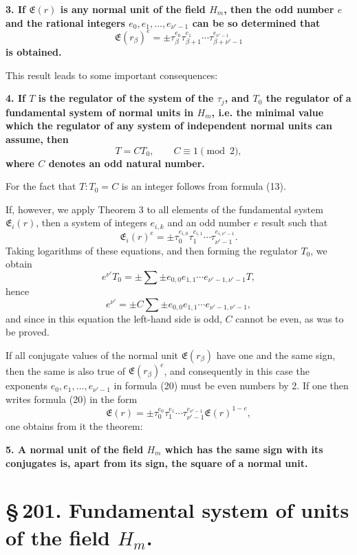 \documentclass[11pt]{article}
\begin{document}
\begin{center}\textbf{3. If $\mathfrak E(r)$ is any normal unit of the field $H_m$, then the odd number $e$ and the rational integers $e_0,e_1,\ldots,e_{\nu'-1}$ can be so determined that}
\[
\mathfrak E(r_\beta)^e=\pm\tau_\beta^{e_0}\tau_{\beta+1}^{e_1}\cdots\tau_{\beta+\nu'-1}^{e_{\nu'-1}}
\tag{20}
\]
\textbf{is obtained.}\end{center}

This result leads to some important consequences:

\begin{center}\textbf{4. If $T$ is the regulator of the system of the $\tau_j$, and $T_0$ the regulator of a fundamental system of normal units in $H_m$, i.e. the minimal value which the regulator of any system of independent normal units can assume, then}
\[
T=CT_0,
\qquad C\equiv1\pmod2,
\tag{21}
\]
\textbf{where $C$ denotes an odd natural number.}\end{center}

For the fact that $T:T_0=C$ is an integer follows from formula (13).

If, however, we apply Theorem 3 to all elements of the fundamental system $\mathfrak E_i(r)$, then a system of integers $e_{i,k}$ and an odd number $e$ result such that
\[
\mathfrak E_i(r)^e=\pm\tau_0^{e_{i,0}}\tau_1^{e_{i,1}}\cdots\tau_{\nu'-1}^{e_{i,\nu'-1}}.
\]
Taking logarithms of these equations, and then forming the regulator $T_0$, we obtain
\[
e^{\nu'}T_0=\pm\sum\pm e_{0,0}e_{1,1}\cdots e_{\nu'-1,\nu'-1}T,
\]
hence
\[
e^{\nu'}=\pm C\sum\pm e_{0,0}e_{1,1}\cdots e_{\nu'-1,\nu'-1},
\]
and since in this equation the left-hand side is odd, $C$ cannot be even, as was to be proved.

If all conjugate values of the normal unit $\mathfrak E(r_\beta)$ have one and the same sign, then the same is also true of $\mathfrak E(r_\beta)^e$, and consequently in this case the exponents $e_0,e_1,\ldots,e_{\nu'-1}$ in formula (20) must be even numbers by 2. If one then writes formula (20) in the form
\[
\mathfrak E(r)=\pm\tau_0^{e_0}\tau_1^{e_1}\cdots\tau_{\nu'-1}^{e_{\nu'-1}}\mathfrak E(r)^{1-e},
\]
one obtains from it the theorem:

\begin{center}\textbf{5. A normal unit of the field $H_m$ which has the same sign with its conjugates is, apart from its sign, the square of a normal unit.}\end{center}

\section*{\S\,201. Fundamental system of units of the field $H_m$.}
\end{document}
